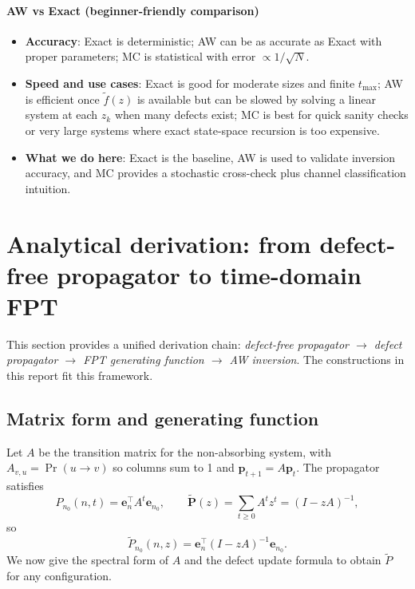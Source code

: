 \documentclass[11pt]{article}
\begin{document}
\paragraph{AW vs Exact (beginner-friendly comparison)}
\begin{itemize}
  \item \textbf{Accuracy}: Exact is deterministic; AW can be as accurate as Exact with proper parameters; MC is statistical with error $\propto 1/\sqrt{N}$.
  \item \textbf{Speed and use cases}: Exact is good for moderate sizes and finite $t_{\max}$; AW is efficient once $\tilde f(z)$ is available but can be slowed by solving a linear system at each $z_k$ when many defects exist; MC is best for quick sanity checks or very large systems where exact state-space recursion is too expensive.
  \item \textbf{What we do here}: Exact is the baseline, AW is used to validate inversion accuracy, and MC provides a stochastic cross-check plus channel classification intuition.
\end{itemize}

\section{Analytical derivation: from defect-free propagator to time-domain FPT}
This section provides a unified derivation chain: \emph{defect-free propagator $\to$ defect propagator $\to$ FPT generating function $\to$ AW inversion}. The constructions in this report fit this framework.

\subsection{Matrix form and generating function}
Let $A$ be the transition matrix for the non-absorbing system, with $A_{v,u}=\Pr(u\to v)$ so columns sum to 1 and $\mathbf{p}_{t+1}=A\mathbf{p}_t$. The propagator satisfies
\begin{equation}
  P_{n_0}(n,t)=\mathbf{e}_n^\top A^t \mathbf{e}_{n_0},
  \qquad
  \tilde{\mathbf{P}}(z)=\sum_{t\ge 0} A^t z^t=(I-zA)^{-1},
\end{equation}
so
\begin{equation}
  \tilde P_{n_0}(n,z)=\mathbf{e}_n^\top (I-zA)^{-1}\mathbf{e}_{n_0}.
\end{equation}
We now give the spectral form of $A$ and the defect update formula to obtain $\tilde P$ for any configuration.
\end{document}
